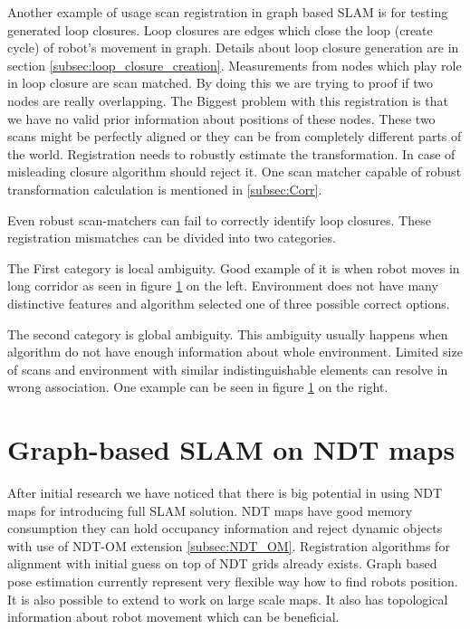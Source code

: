 Another example of usage scan registration in graph based \gls{SLAM} is for testing generated loop closures. Loop closures are edges which close the loop (create cycle) of robot's movement in graph. Details about loop closure generation are in section \ref{subsec:loop_closure_creation}. Measurements from nodes which play role in loop closure are scan matched. By doing this we are trying to proof if two nodes are really overlapping.  The Biggest problem with this registration is that we have no valid prior information about positions of these nodes. These two scans might be perfectly aligned or they can be from completely different parts of the world. Registration needs to robustly estimate the transformation. In case of misleading closure algorithm should reject it. One scan matcher capable of robust transformation calculation is mentioned in \ref{subsec:Corr}.  


Even robust scan-matchers can fail to correctly identify loop closures.  These registration mismatches can be divided into two categories.

The First category is local ambiguity. Good example of it is when robot moves in long corridor as seen in figure \ref{Pic_coridor} on the left. Environment does not have many distinctive features and algorithm selected one of three possible correct options.

The second category is global ambiguity. This ambiguity usually happens when algorithm do not have enough information about whole environment. Limited size of scans and environment with similar indistinguishable elements can resolve in wrong association. One example can be seen in figure \ref{Pic_coridor} on the right.   
     
 \begin{figure}
 \label{Pic_coridor}

 \end{figure}

  \newpage
  
\section {Graph-based SLAM on NDT maps}


After initial research we have noticed that there is big potential in using \gls{NDT} maps for introducing full \gls{SLAM} solution. \gls{NDT} maps have good memory consumption they can hold occupancy information and reject dynamic objects with use of \gls{NDT-OM} extension \ref{subsec:NDT_OM}. Registration algorithms for alignment with initial guess on top of \gls{NDT} grids already exists. Graph based pose estimation currently represent very flexible way how to find robots position. It is also possible to extend to work on large scale maps. It also has topological information about robot movement which can be beneficial. 

